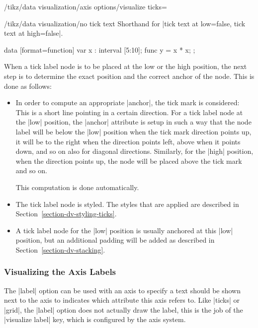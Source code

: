 \begin{key}{/tikz/data visualization/axis options/visualize ticks=}
  \begin{key}{/tikz/data visualization/no tick text}
    Shorthand for |tick text at low=false, tick text at high=false|. 
\begin{codeexample}[]
\tikz \datavisualization [scientific axes, all axes={length=3cm},
                          x axis={ticks={
                              major also at={6.5 as [no tick text]}}},
                          visualize as smooth line]
  data [format=function] {
    var x : interval [5:10];
    func y = \value x * \value x;
  };
\end{codeexample}  
  \end{key}
  
  When a tick label node is to be placed at the low or the high
  position, the next step is to determine the exact position and the
  correct anchor of the node. This is done as follows:
  \begin{itemize}
  \item In order to compute an appropriate |anchor|, the tick mark is
    considered: This is a short line pointing in a certain
    direction. For a tick label node at the |low| position, the
    |anchor| attribute is setup in such a way that the node label will
    be below the |low| position when the tick mark direction points
    up, it will be to the right when the direction points left, above
    when it points down, and so on also for diagonal
    directions. Similarly, for the |high| position, when the direction
    points up, the node will be placed above the tick mark and so on.

    This computation is done automatically.
  \item The tick label node is styled. The styles that are applied are
    described in Section~\ref{section-dv-styling-ticks}.
  \item A tick label node for the |low| position is usually anchored
    at this |low| position, but an additional padding will be
    added as described in Section~\ref{section-dv-stacking}.
  \end{itemize}
\end{key}




\subsubsection{Visualizing the Axis Labels}

\label{section-dv-visualize-label}

The |label| option can be used with an axis to specify a text should
be shown next to the axis to indicates which attribute this axis
refers to. Like |ticks| or |grid|, the |label| option does not
actually draw the label, this is the job of the |visualize label| key,
which is configured by the axis system.

